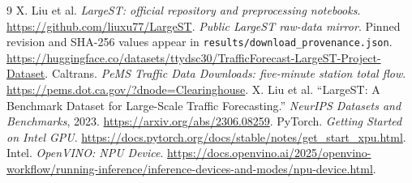 \documentclass[11pt,a4paper]{article}
\begin{document}
\FloatBarrier
\begingroup\small
\begin{thebibliography}{9}\setlength{\itemsep}{2pt}\setlength{\parskip}{0pt}
 X. Liu et al. \emph{LargeST: official repository and preprocessing notebooks}. \url{https://github.com/liuxu77/LargeST}.
 \emph{Public LargeST raw-data mirror}. Pinned revision and SHA-256 values appear in \texttt{results/download\_provenance.json}. \url{https://huggingface.co/datasets/ttydsc30/TrafficForecast-LargeST-Project-Dataset}.
 Caltrans. \emph{PeMS Traffic Data Downloads: five-minute station total flow}. \url{https://pems.dot.ca.gov/?dnode=Clearinghouse}.
 X. Liu et al. ``LargeST: A Benchmark Dataset for Large-Scale Traffic Forecasting.'' \emph{NeurIPS Datasets and Benchmarks}, 2023. \url{https://arxiv.org/abs/2306.08259}.
 PyTorch. \emph{Getting Started on Intel GPU}. \url{https://docs.pytorch.org/docs/stable/notes/get_start_xpu.html}.
 Intel. \emph{OpenVINO: NPU Device}. \url{https://docs.openvino.ai/2025/openvino-workflow/running-inference/inference-devices-and-modes/npu-device.html}.
\end{thebibliography}
\endgroup
\end{document}
